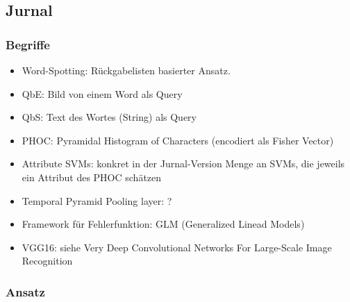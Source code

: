 \subsection{Jurnal}

\subsubsection{Begriffe}

\begin{itemize}
    \item Word-Spotting: Rückgabelisten basierter Ansatz.
    \item QbE: Bild von einem Word als Query
    \item QbS: Text des Wortes (String) als Query
    \item PHOC: Pyramidal Histogram of Characters (encodiert als Fisher Vector)
    \item Attribute SVMs: konkret in der Jurnal-Version Menge an SVMs, die jeweils ein Attribut des PHOC schätzen
    \item Temporal Pyramid Pooling layer: ?
    \item Framework für Fehlerfunktion: GLM (Generalized Linead Models)
    \item VGG16: siehe Very Deep Convolutional Networks For Large-Scale Image Recognition
\end{itemize}

\subsubsection{Ansatz}
